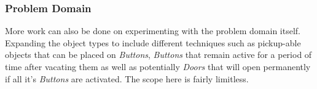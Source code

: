 \documentclass{IEEEtran}
\begin{document}
\subsubsection{Problem Domain}
More work can also be done on experimenting with the problem domain itself. Expanding the object types to include different techniques such as pickup-able objects that can be placed on \emph{Buttons}, \emph{Buttons} that remain active for a period of time after vacating them as well as potentially \emph{Doors} that will open permanently if all it's \emph{Buttons} are activated. The scope here is fairly limitless.



\end{document}

